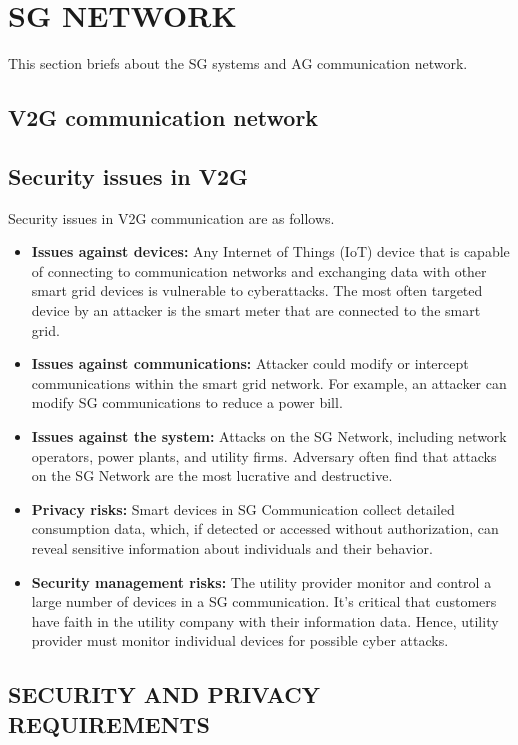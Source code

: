 \documentclass[3p,times,onecolumn]{elsarticle}
\begin{document}
\section{SG NETWORK}
This section briefs about the SG systems and AG communication network.

\subsection{V2G communication network }



\subsection{Security issues in V2G}

Security issues in V2G communication are as follows.
\begin{itemize}
\item \textbf{Issues against devices:} 
Any Internet of Things (IoT) device that is capable of connecting to communication networks and exchanging data with other smart grid devices is vulnerable to cyberattacks.  The most often targeted device by an attacker is the smart meter that are connected to the smart grid.
\item \textbf{Issues against communications:}
Attacker could modify or intercept communications within the smart grid network. For example, an attacker can modify SG communications to reduce a power bill.
\item \textbf{Issues against the system:}
Attacks on the SG Network, including network operators, power plants, and utility firms. Adversary often find that attacks on the SG Network are the most  lucrative and destructive. 
\item \textbf{Privacy risks:}
Smart devices in SG Communication collect detailed consumption data, which, if detected or accessed without authorization, can reveal sensitive information about individuals and their behavior.
\item \textbf{Security management risks:}
The utility provider monitor and control a large number of devices in a SG communication.
It’s critical that customers have faith in the utility company with their information data. 
Hence,  utility provider must monitor individual devices for possible cyber attacks.
\end{itemize}

\subsection{SECURITY AND PRIVACY REQUIREMENTS}
\end{document}
